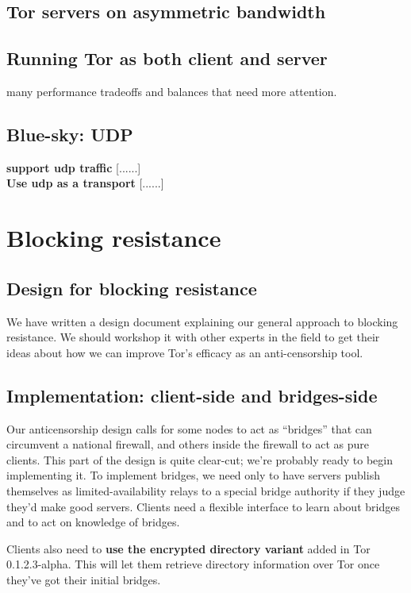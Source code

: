 \documentclass{article}
\newcommand{\tmp}[1]{{\bf #1} [......] \\}
\begin{document}
\subsection{Tor servers on asymmetric bandwidth}

\subsection{Running Tor as both client and server}

many performance tradeoffs and balances that need more attention.

\subsection{Blue-sky: UDP}

\tmp{support udp traffic}

\tmp{Use udp as a transport}




\section{Blocking resistance}

\subsection{Design for blocking resistance}
We have written a design document explaining our general approach to blocking
resistance.  We should workshop it with other experts in the field to get
their ideas about how we can improve Tor's efficacy as an anti-censorship
tool.


\subsection{Implementation: client-side and bridges-side}
Our anticensorship design calls for some nodes to act as ``bridges'' that can
circumvent a national firewall, and others inside the firewall to act as pure
clients.  This part of the design is quite clear-cut; we're probably ready to begin
implementing it.  To implement bridges, we need only to have servers publish
themselves as limited-availability relays to a special bridge authority if
they judge they'd make good servers.  Clients need a flexible interface to
learn about bridges and to act on knowledge of bridges.

Clients also need to {\bf use the encrypted directory variant} added in Tor
0.1.2.3-alpha.  This will let them retrieve directory information over Tor
once they've got their initial bridges.
\end{document}
